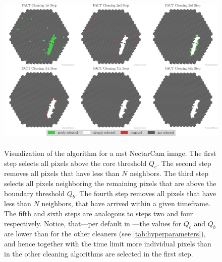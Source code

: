 \begin{figure}
    \centering
    \includegraphics[height=8cm]{plots/cleaner_steps/fact.pdf}
    \caption{Visualization of the \fact{} algorithm for a \gls{mst} NectarCam image. The first
    step selects all pixels above the core threshold \(Q_c\). The second step removes all pixels that have less than
    \(N\) neighbors. The third step selects all pixels neighboring the remaining pixels that are above the
    boundary threshold \(Q_b\). The fourth step removes all pixels that have less than \(N\) neighbors,
    that have arrived within a given timeframe. The fifth and sixth steps are analogous to steps two and four respectively.
    Notice, that---per default in \ctapipe---the values for \(Q_c\) and \(Q_b\) are lower than for the other cleaners
    (see \autoref{tab:hyperparameters}), and hence together with the time limit more individual pixels than in the
    other cleaning algorithms are selected in the first step.}
    \label{fig:fact_cleaning}
\end{figure}

